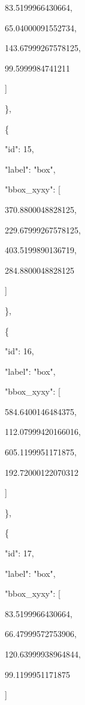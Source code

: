 \documentclass[10pt,a4paper]{article}
\begin{document}
        83.5199966430664,\allowbreak{}\par
        65.04000091552734,\allowbreak{}\par
        143.67999267578125,\allowbreak{}\par
        99.5999984741211\par
      ]\par
    \},\allowbreak{}\par
    \{\par
      "id":\allowbreak{} 15,\allowbreak{}\par
      "label":\allowbreak{} "box",\allowbreak{}\par
      "bbox\_xyxy":\allowbreak{} [\par
        370.8800048828125,\allowbreak{}\par
        229.67999267578125,\allowbreak{}\par
        403.5199890136719,\allowbreak{}\par
        284.8800048828125\par
      ]\par
    \},\allowbreak{}\par
    \{\par
      "id":\allowbreak{} 16,\allowbreak{}\par
      "label":\allowbreak{} "box",\allowbreak{}\par
      "bbox\_xyxy":\allowbreak{} [\par
        584.6400146484375,\allowbreak{}\par
        112.07999420166016,\allowbreak{}\par
        605.1199951171875,\allowbreak{}\par
        192.72000122070312\par
      ]\par
    \},\allowbreak{}\par
    \{\par
      "id":\allowbreak{} 17,\allowbreak{}\par
      "label":\allowbreak{} "box",\allowbreak{}\par
      "bbox\_xyxy":\allowbreak{} [\par
        83.5199966430664,\allowbreak{}\par
        66.47999572753906,\allowbreak{}\par
        120.63999938964844,\allowbreak{}\par
        99.1199951171875\par
      ]\par
\end{document}
